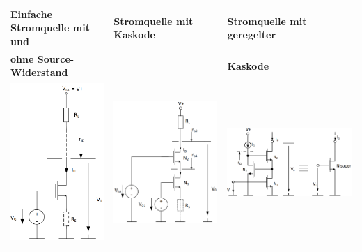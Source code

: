 \begin{tabular}{|l|l|l|}
    \hline
    \textbf{Einfache Stromquelle mit und} & \textbf{Stromquelle mit Kaskode} & \textbf{Stromquelle mit geregelter} \\
    \textbf{ohne Source-Widerstand}         &                                  & \textbf{Kaskode} \\
    \includegraphics[width=0.15\linewidth]{Einfachste Stromquelle.png} & \includegraphics[width=0.2\linewidth]{Stromquelle mit Kaskode.png} & \includegraphics[width=0.3\linewidth]{Super Transistor.png} \\
    \hline
\end{tabular} \vspace{5pt}\\
\renewcommand{\arraystretch}{1.2}
